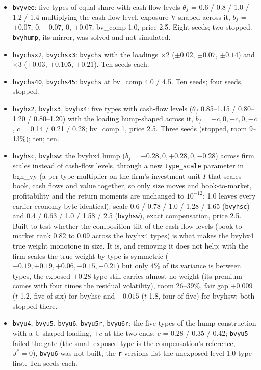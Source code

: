 \begin{itemize}
\item \texttt{bvyvee}: five types of equal share with cash-flow levels $\theta_f$ = 0.6 / 0.8 / 1.0 / 1.2 / 1.4 multiplying the cash-flow level, exposure V-shaped across it, $b_f$ = $+0.07$, 0, $-0.07$, 0, $+0.07$; bv\_comp 1.0, price 2.5. Eight seeds; two stopped. \texttt{bvyhump}, its mirror, was solved and not simulated.
\item \texttt{bvychsx2}, \texttt{bvychsx3}: \texttt{bvychs} with the loadings $\times2$ ($\pm0.02$, $\pm0.07$, $\pm0.14$) and $\times3$ ($\pm0.03$, $\pm0.105$, $\pm0.21$). Ten seeds each.
\item \texttt{bvychs40}, \texttt{bvychs45}: \texttt{bvychs} at bv\_comp 4.0 / 4.5. Ten seeds; four seeds, stopped.
\item \texttt{bvyhx2}, \texttt{bvyhx3}, \texttt{bvyhx4}: five types with cash-flow levels ($\theta_f$ 0.85--1.15 / 0.80--1.20 / 0.80--1.20) with the loading hump-shaped across it, $b_f=-c,0,+c,0,-c$, $c$ = 0.14 / 0.21 / 0.28; bv\_comp 1, price 2.5. Three seeds (stopped, room 9--13\%); ten; ten.
\item \texttt{bvyhsc}, \texttt{bvyhsw}: the bvyhx4 hump ($b_f = -0.28, 0, +0.28, 0, -0.28$) across firm scales instead of cash-flow levels, through a new \texttt{type\_scale} parameter in bgn\_vy (a per-type multiplier on the firm's investment unit $I$ that scales book, cash flows and value together, so only size moves and book-to-market, profitability and the return moments are unchanged to $10^{-12}$; 1.0 leaves every earlier economy byte-identical): scale 0.6 / 0.78 / 1.0 / 1.28 / 1.65 (\texttt{bvyhsc}) and 0.4 / 0.63 / 1.0 / 1.58 / 2.5 (\texttt{bvyhsw}), exact compensation, price 2.5. Built to test whether the composition tilt of the cash-flow levels (book-to-market rank 0.82 to 0.09 across the bvyhx4 types) is what makes the bvyhx4 true weight monotone in size. It is, and removing it does not help: with the firm scales the true weight by type is symmetric ($-0.19, +0.19, +0.06, +0.15, -0.21$) but only 4\% of its variance is between types, the exposed $+0.28$ type still carries almost no weight (its premium comes with four times the residual volatility), room 26--39\%, fair gap $+0.009$ ($t$ 1.2, five of six) for bvyhsc and $+0.015$ ($t$ 1.8, four of five) for bvyhsw; both stopped there.
\item \texttt{bvyu4}, \texttt{bvyu5}, \texttt{bvyu6}, \texttt{bvyu5r}, \texttt{bvyu6r}: the five types of the hump construction with a U-shaped loading, $+c$ at the two ends, $c$ = 0.28 / 0.35 / 0.42; \texttt{bvyu5} failed the gate (the small exposed type is the compensation's reference, $J^* = 0$), \texttt{bvyu6} was not built, the \texttt{r} versions list the unexposed level-1.0 type first. Ten seeds each.

\end{itemize}
